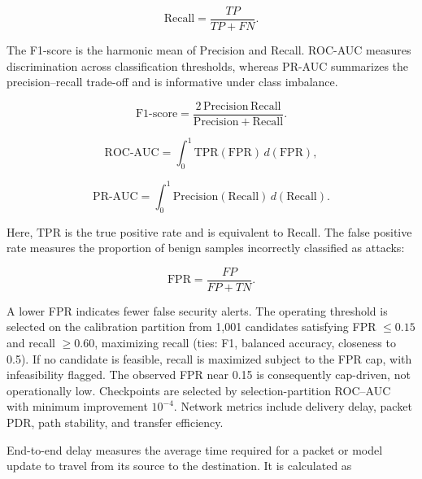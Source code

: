 \documentclass[5p,times,numafflabel]{elsarticle}
\begin{document}
\begin{equation}
	\mathrm{Recall}
	=
	\frac{TP}{TP+FN}.
	\label{eq:recall}
\end{equation}

The F1-score is the harmonic mean of Precision and Recall.
ROC-AUC measures discrimination across classification
thresholds, whereas PR-AUC summarizes the precision--recall
trade-off and is informative under class imbalance.

\begin{equation}
	\mathrm{F1\mbox{-}score}
	=
	\frac{
		2\,\mathrm{Precision}\,\mathrm{Recall}
	}{
		\mathrm{Precision}+\mathrm{Recall}
	}.
	\label{eq:f1-score}
\end{equation}

\begin{equation}
	\mathrm{ROC\mbox{-}AUC}
	=
	\int_{0}^{1}
	\mathrm{TPR}(\mathrm{FPR})
	\,d(\mathrm{FPR}),
	\label{eq:roc-auc}
\end{equation}

\begin{equation}
	\mathrm{PR\mbox{-}AUC}
	=
	\int_{0}^{1}
	\mathrm{Precision}(\mathrm{Recall})
	\,d(\mathrm{Recall}).
	\label{eq:pr-auc}
\end{equation}

Here, \(\mathrm{TPR}\) is the true positive rate and is
equivalent to Recall. The false positive rate measures
the proportion of benign samples incorrectly classified
as attacks:

\begin{equation}
	\mathrm{FPR}
	=
	\frac{FP}{FP+TN}.
	\label{eq:fpr}
\end{equation}
	
	
	A lower FPR indicates fewer false security alerts. The operating
	threshold is selected on the calibration partition from 1,001
	candidates satisfying FPR $\leq0.15$ and recall $\geq0.60$,
	maximizing recall (ties: F1, balanced accuracy, closeness to 0.5).
	If no candidate is feasible, recall is maximized subject to the
	FPR cap, with infeasibility flagged. The observed FPR near 0.15
	is consequently cap-driven, not operationally low. Checkpoints
	are selected by selection-partition ROC--AUC with minimum
	improvement $10^{-4}$. Network metrics include delivery delay,
	packet PDR, path stability, and transfer efficiency.
	
	End-to-end delay measures the average time required for a packet or
	model update to travel from its source to the destination. It is
	calculated as
	
\end{document}
